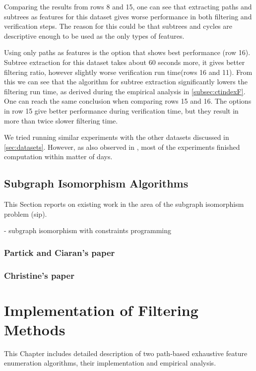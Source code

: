 \documentclass{l4proj}
\begin{document}
Comparing the results from rows 8 and 15, one can see that extracting paths and subtrees as features for this dataset gives worse performance in both filtering and verification steps. The reason for this could be that subtrees and cycles are descriptive enough to be used as the only types of features.

Using only paths as features is the option that shows best performance (row 16). Subtree extraction for this dataset takes about 60 seconds more, it gives better filtering ratio, however slightly worse verification run time(rows 16 and 11). From this we can see that the algorithm for subtree extraction significantly lowers the filtering run time, as derived during the empirical analysis in \ref{subsec:ctindexF}. One can reach the same conclusion when comparing rows 15 and 16. The options in row 15 give better performance during verification time, but they result in more than twice slower filtering time.

We tried running similar experiments with the other datasets discussed in \ref{sec:datasets}. However, as also observed in \cite{foteini}, most of the experiments finished computation within matter of days.


\section{Subgraph Isomorphism Algorithms}
\label{sec:sipalgos}
This Section reports on existing work in the area of the subgraph isomorphism problem (\gls{sip}).

- subgraph isomorphism with constraints programming

\subsection{Partick and Ciaran's paper}
\label{sec:sippatrick}

\subsection{Christine's paper}
\label{sec:sipchristine}

\chapter{Implementation of Filtering Methods}
This Chapter includes detailed description of two path-based exhaustive feature enumeration algorithms, their implementation and empirical analysis.
\end{document}

